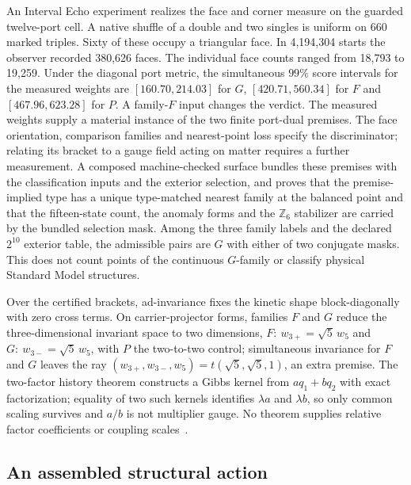 \documentclass[11pt]{article}
\begin{document}
An Interval Echo experiment realizes the face and corner measure on the
guarded twelve-port cell. A native shuffle of a double and two singles
is uniform on 660 marked triples. Sixty of these occupy a triangular face.
In 4,194,304 starts the observer recorded 380,626 faces. The individual
face counts ranged from 18,793 to 19,259. Under the diagonal port metric,
the simultaneous $99\%$ score intervals for the measured weights are
$[160.70,214.03]$ for $G$, $[420.71,560.34]$ for $F$ and
$[467.96,623.28]$ for $P$. A family-$F$ input changes the verdict.
The measured weights supply a material instance of the two finite
port-dual premises. The face orientation, comparison families and
nearest-point loss specify the discriminator; relating its bracket to
a gauge field acting on matter requires a further measurement. A composed machine-checked surface bundles these premises
with the classification inputs and the exterior selection, and proves that
the premise-implied type has a unique type-matched nearest family at the
balanced point and that the fifteen-state count, the anomaly forms and the
\(\mathbb Z_6\) stabilizer are carried by the bundled selection mask. Among the
three family labels and the declared \(2^{10}\) exterior table, the admissible
pairs are \(G\) with either of two conjugate masks. This does not count points
of the continuous \(G\)-family or classify physical Standard Model structures.

Over the certified brackets, ad-invariance fixes the kinetic shape
block-diagonally with zero cross terms. On carrier-projector forms, families
\(F\) and \(G\) reduce the three-dimensional invariant space to two
dimensions, \(F:\ w_{3+}=\sqrt5\,w_5\) and \(G:\ w_{3-}=\sqrt5\,w_5\), with
\(P\) the two-to-two control; simultaneous invariance for \(F\) and \(G\) leaves
the ray \((w_{3+},w_{3-},w_5)=t(\sqrt5,\sqrt5,1)\), an extra premise. The
two-factor history theorem constructs a Gibbs kernel from \(aq_1+bq_2\) with
exact factorization; equality of two such kernels identifies \(\lambda a\) and
\(\lambda b\), so only common scaling survives and \(a/b\) is not multiplier
gauge. No theorem supplies relative factor coefficients or coupling
scales~\cite{ophfpe,ophrepo}.

\subsection{An assembled structural action}
\end{document}
